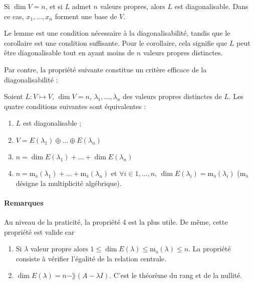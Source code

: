 \begin{corol}
Si $\dim V=n$, et si $L$ admet $n$ valeurs propres, alors $L$ est diagonalisable. Dans ce cas, $x_1,\ldots,x_n$ forment une base de $V$.
\end{corol}

Le lemme est une condition nécessaire à la diagonalisabilité, tandis que le corollaire est une condition suffisante. Pour le corollaire, cela signifie que $L$ peut être diagonalisable tout en ayant moins de $n$ valeurs propres distinctes.

Par contre, la propriété suivante constitue un critère efficace de la diagonalisabilité :

\begin{propriete}
Soient $L \colon V \mapsto V$, $\dim V=n$, $\lambda_1,\ldots,\lambda_n$ des valeurs propres distinctes de $L$. Les quatre conditions suivantes sont équivalentes :
\begin{enumerate}
\item $L$ est diagonalisable ;
\item $V = E(\lambda_1) \oplus \ldots \oplus E(\lambda_n)$
\item $n=\dim E(\lambda_1) + \ldots + \dim E(\lambda_n)$
\item $n=\mathrm{m_a}(\lambda_1) + \ldots + \mathrm{m_a}(\lambda_n)$ et $\forall i \in 1, \ldots, n$, $\dim E(\lambda_i) = \mathrm{m_a}(\lambda_i)$ ($\mathrm{m_a}$ désigne la multiplicité algébrique).
\end{enumerate}
\end{propriete}

\paragraph{Remarques}
Au niveau de la praticité, la propriété 4 est la plus utile. De même, cette propriété est valide car

\begin{enumerate}
\item Si $\lambda$ valeur propre alors $1 \le \dim E(\lambda) \le \mathrm{m_a}(\lambda) \le n$. La propriété consiste à vérifier l'égalité de la relation centrale.
\item $\dim E(\lambda) = n - \rang(A-\lambda I)$. C'est le théorème du rang et de la nullité.
\end{enumerate}

% 
